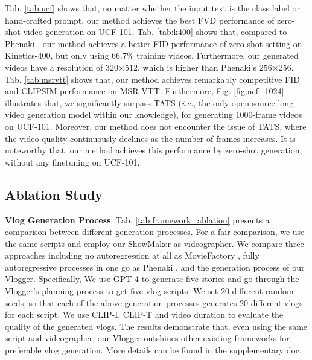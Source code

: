 Tab. \ref{tab:ucf} shows that,
no matter whether the input text is the class label or hand-crafted prompt, 
our method achieves the best FVD performance of zero-shot video generation on UCF-101.
Tab. \ref{tab:k400} shows that,
compared to Phenaki \cite{villegas2023phenaki},
our method achieves a better FID performance of zero-shot setting on Kinetics-400, 
but only using 66.7\% training videos.
Furthermore, our generated videos have a resolution of $320$$\times$$512$, which is higher than Phenaki's $256$$\times$$256$.
Tab. \ref{tab:msrvtt} shows that,
our method achieves remarkably competitive FID and CLIPSIM performance on MSR-VTT.
Furthermore, 
Fig. \ref{fig:ucf_1024} illustrates that,
we significantly surpass TATS \cite{ge2022long} (\textit{i.e.}, the only open-source long video generation model within our knowledge),
for generating 1000-frame videos on UCF-101.
Moreover,
our method does not encounter the issue of TATS,
where the video quality continuously declines as the number of frames increases.
It is noteworthy that,
our method achieves this performance by zero-shot generation,
without any finetuning on UCF-101.



\subsection{Ablation Study}

\textbf{Vlog Generation Process}.
Tab. \ref{tab:framework_ablation} presents a comparison between different generation processes. 
For a fair comparison, 
we use the same scripts and employ our ShowMaker as videographer. 
We compare three approaches including
no autoregression at all as MovieFactory \cite{Zhu2023MovieFactoryAM}, 
fully autoregressive processes in one go as Phenaki \cite{villegas2023phenaki}, 
and 
the generation process of our Vlogger.
Specifically,
We use GPT-4 to generate five stories and go through the Vlogger’s planning process to get five vlog scripts.
We set 20 different random seeds,
so that each of the above generation processes generates 20 different vlogs for each script.
We use CLIP-I, CLIP-T \cite{Ye2023IPAdapterTC} and video duration to evaluate the quality of the generated vlogs. 
The results demonstrate that,
even using the same script and videographer, 
our Vlogger outshines other existing frameworks for preferable vlog generation. 
More details can be found in the supplementary doc.

